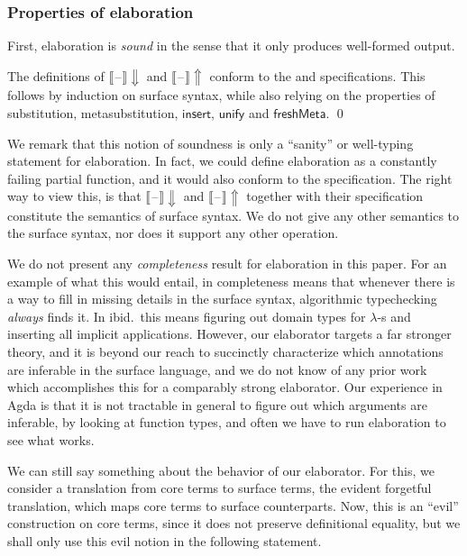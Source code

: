 \documentclass[acmsmall,review,anonymous,prologue,dvipsnames]{acmart}\settopmatter{printfolios=true,printccs=false,printacmref=false}
\newcommand{\blank}{\mathord{\hspace{1pt}\text{--}\hspace{1pt}}}
\newcommand{\unify}{\mathsf{unify}}
\newcommand{\echeckblank}{\llbracket\blank\rrbracket\!\Downarrow}
\newcommand{\einferblank}{\llbracket\blank\rrbracket\!\Uparrow}
\theoremstyle{remark}
\begin{document}
\subsubsection{Properties of elaboration}
First, elaboration is \emph{sound} in the sense that it only produces well-formed
output.

\begin{theorem}[Soundness] The definitions of $\echeckblank$ and
$\einferblank$ conform to the  and 
  specifications. This follows by induction on surface syntax, while also
  relying on the properties of substitution, metasubstitution,
  $\mathsf{insert}$, $\unify$ and $\mathsf{freshMeta}$. \qed
\end{theorem}

We remark that this notion of soundness is only a ``sanity'' or well-typing
statement for elaboration. In fact, we could define elaboration as a constantly
failing partial function, and it would also conform to the specification. The
right way to view this, is that $\echeckblank$ and $\einferblank$ together
with their specification constitute the semantics of surface syntax. We do not
give any other semantics to the surface syntax, nor does it support any other
operation.

We do not present any \emph{completeness} result for elaboration in this
paper. For an example of what this would entail, in \cite{dunfield2013complete}
completeness means that whenever there is a way to fill in missing details in
the surface syntax, algorithmic typechecking \emph{always} finds it. In
ibid.\ this means figuring out domain types for $\lambda$-s and inserting all
implicit applications. However, our elaborator targets a far stronger theory,
and it is beyond our reach to succinctly characterize which annotations are
inferable in the surface language, and we do not know of any prior work which
accomplishes this for a comparably strong elaborator. Our experience in Agda is
that it is not tractable in general to figure out which arguments are inferable,
by looking at function types, and often we have to run elaboration to see what
works.

We can still say something about the behavior of our elaborator. For this, we
consider a translation from core terms to surface terms, the evident forgetful
translation, which maps core terms to surface counterparts. Now, this is an
``evil'' construction on core terms, since it does not preserve definitional
equality, but we shall only use this evil notion in the following statement.
\end{document}
